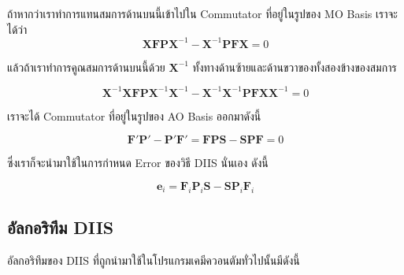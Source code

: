 \noindent ถ้าหากว่าเราทำการแทนสมการด้านบนนี้เข้าไปใน Commutator ที่อยู่ในรูปของ MO Basis เราจะได้ว่า 
\begin{equation}
  \mathbf{X} \mathbf{F} \mathbf{P} \mathbf{X}^{-1} - \mathbf{X}^{-1} \mathbf{P} \mathbf{F} \mathbf{X} 
  = 
  0
\end{equation}

\noindent แล้วถ้าเราทำการคูณสมการด้านบนนี้ด้วย $\mathbf{X}^{-1}$ ทั้งทางด้านซ้ายและด้านขวาของทั้งสองข้างของสมการ 

\begin{equation}
  \mathbf{X}^{-1} \mathbf{X} \mathbf{F} \mathbf{P} \mathbf{X}^{-1} \mathbf{X}^{-1} 
  - 
  \mathbf{X}^{-1} \mathbf{X}^{-1} \mathbf{P} \mathbf{F} \mathbf{X} \mathbf{X}^{-1} 
  =
  0
\end{equation}

\noindent เราจะได้ Commutator ที่อยู่ในรูปของ AO Basis ออกมาดังนี้ 

\begin{equation}
  \mathbf{F'}\mathbf{P'} - \mathbf{P'}\mathbf{F'} 
  = 
  \mathbf{F} \mathbf{P} \mathbf{S} - \mathbf{S} \mathbf{P} \mathbf{F} 
  = 
  0
\end{equation}

\noindent ซึ่งเราก็จะนำมาใช้ในการกำหนด Error ของวิธี DIIS นั่นเอง ดังนี้

\begin{equation}
  \label{eq:diis_error_hf}
  \mathbf{e}_i 
  = 
  \mathbf{F}_i \mathbf{P}_i \mathbf{S} - \mathbf{S} \mathbf{P}_i \mathbf{F}_i
\end{equation}

\subsection{อัลกอริทึม DIIS}

อัลกอริทึมของ DIIS ที่ถูกนำมาใช้ในโปรแกรมเคมีควอนตัมทั่วไปนั้นมีดังนี้ 

